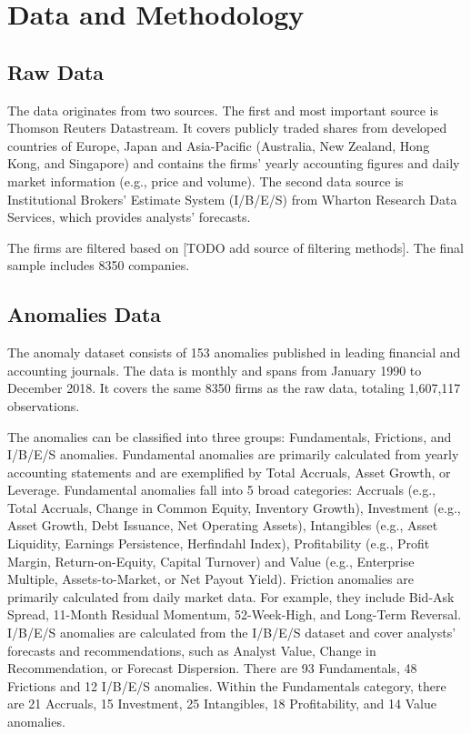\chapter{Data and Methodology}
\label{chap:met}

\section{Raw Data}

The data originates from two sources. The first and most important source is Thomson Reuters Datastream. It covers publicly traded shares from developed countries of Europe, Japan and Asia-Pacific (Australia, New Zealand, Hong Kong, and Singapore) and contains the firms' yearly accounting figures and daily market information (e.g., price and volume).  The second data source is Institutional Brokers’ Estimate System (I/B/E/S) from Wharton Research Data Services, which provides analysts' forecasts. 

The firms are filtered based on [TODO add source of filtering methods].  
The final sample includes 8350 companies.


\section{Anomalies Data}
The anomaly dataset consists of 153 anomalies published in leading financial and accounting journals. The data is monthly and spans from January 1990 to December 2018. It covers the same 8350 firms as the raw data, totaling 1,607,117 observations. 

The anomalies can be classified into three groups: Fundamentals, Frictions, and I/B/E/S anomalies. Fundamental anomalies are primarily calculated from yearly accounting statements and are exemplified by Total Accruals, Asset Growth, or Leverage. Fundamental anomalies fall into 5 broad categories: Accruals (e.g., Total Accruals, Change in Common Equity, Inventory Growth), Investment (e.g., Asset Growth, Debt Issuance, Net Operating Assets), Intangibles (e.g., Asset Liquidity, Earnings Persistence, Herfindahl Index), Profitability (e.g., Profit Margin, Return-on-Equity, Capital Turnover) and Value (e.g., Enterprise Multiple, Assets-to-Market, or Net Payout Yield). Friction anomalies are primarily calculated from daily market data. For example, they include Bid-Ask Spread, 11-Month Residual Momentum, 52-Week-High, and Long-Term Reversal. I/B/E/S anomalies are calculated from the I/B/E/S dataset and cover analysts' forecasts and recommendations, such as Analyst Value, Change in Recommendation, or Forecast Dispersion. There are 93 Fundamentals, 48 Frictions and 12 I/B/E/S anomalies. Within the Fundamentals category, there are 21 Accruals, 15 Investment, 25 Intangibles, 18 Profitability, and 14 Value anomalies.  

